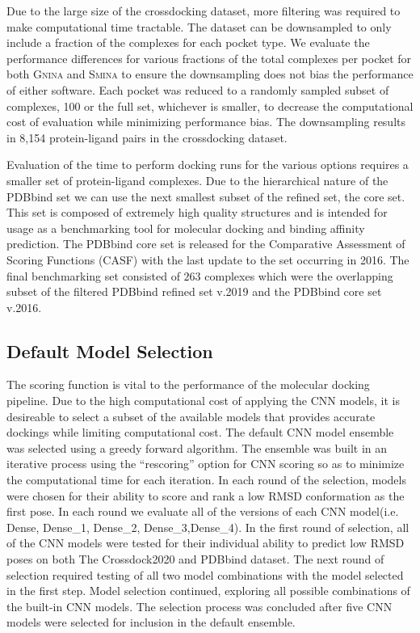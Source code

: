\documentclass[journal=jcisd8,manuscript=article]{achemso}
\begin{document}
Due to the large size of the crossdocking dataset, more filtering was required to make computational time tractable. The dataset can be downsampled to only include a fraction of the complexes for each pocket type. We evaluate the performance differences for various fractions of the total complexes per pocket for both \textsc{Gnina} and \textsc{Smina} to ensure the downsampling does not bias the performance of either software. Each pocket was reduced to a randomly sampled subset of complexes, 100 or the full set, whichever is smaller, to decrease the computational cost of evaluation while minimizing performance bias. The downsampling results in 8,154 protein-ligand pairs in the crossdocking dataset. 

Evaluation of the time to perform docking runs for the various options requires a smaller set of protein-ligand complexes. Due to the hierarchical nature of the PDBbind set we can use the next smallest subset of the refined set, the core set. This set is composed of extremely high quality structures and is intended for usage as a benchmarking tool for molecular docking and binding affinity prediction. The PDBbind core set is released for the Comparative Assessment of Scoring Functions (CASF) with the last update to the set occurring in 2016\cite{su2018comparative}. The final benchmarking set consisted of $263$ complexes which were the overlapping subset of the filtered PDBbind refined set v.2019 and the PDBbind core set v.2016.


\subsection{Default Model Selection}
The scoring function is vital to the performance of the molecular docking pipeline. Due to the high computational cost of applying the CNN models, it is desireable to select a subset of the available models that provides accurate dockings while limiting computational cost. The default CNN model ensemble was selected using a greedy forward algorithm. The ensemble was built in an iterative process using the ``rescoring'' option for CNN scoring so as to minimize the computational time for each iteration. In each round of the selection, models were chosen for their ability to score and rank a low RMSD conformation as the first pose. In each round we evaluate all of the versions of each CNN model(i.e. Dense, Dense\_1, Dense\_2, Dense\_3,Dense\_4). In the first round of selection, all of the CNN models were tested for their individual ability to predict low RMSD poses on both The Crossdock2020 and PDBbind dataset. The next round of selection required testing of all two model combinations with the model selected in the first step. Model selection continued, exploring all possible combinations of the built-in CNN models. The selection process was concluded after five CNN models were selected for inclusion in the default ensemble.
\end{document}
